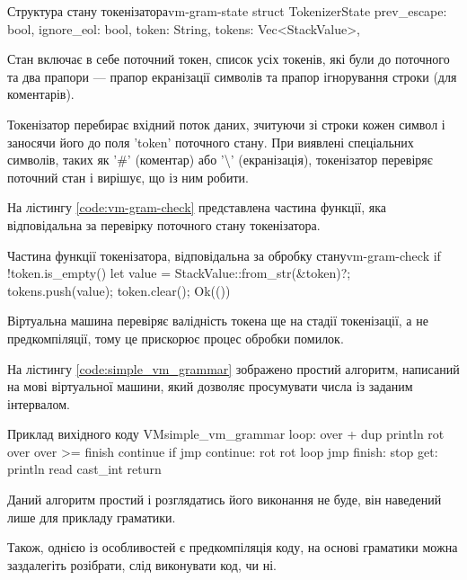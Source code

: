 \documentclass{lib/styles/default-style}
\begin{document}
    \begin{stdout}{Структура стану токенізатора}{vm-gram-state}
        struct TokenizerState {
            prev_escape: bool,
            ignore_eol: bool,
            token: String,
            tokens: Vec<StackValue>,
        }\end{stdout}

    Стан включає в себе поточний токен, список усіх токенів, які були до поточного та два прапори --- прапор екранізації символів 
    та прапор ігнорування строки (для коментарів).

    Токенізатор перебирає вхідний поток даних, зчитуючи зі строки кожен символ і заносячи його до поля 'token' поточного стану.
    При виявлені спеціальних символів, таких як '\#' (коментар) або '\textbackslash' (екранізація), токенізатор перевіряє поточний стан і вирішує,
    що із ним робити.

    На лістингу \ref{code:vm-gram-check} представлена частина функції, яка відповідальна за перевірку поточного стану токенізатора.

    \begin{stdout}{Частина функції токенізатора, відповідальна за обробку стану}{vm-gram-check}
        if !token.is_empty() {
            let value = StackValue::from_str(&token)?;
            tokens.push(value);
            token.clear();
        }
        Ok(())\end{stdout}
    
    Віртуальна машина перевіряє валідність токена ще на стадії токенізації, а не предкомпіляції, тому це прискорює процес обробки
    помилок. 

    На лістингу \ref{code:simple_vm_grammar} зображено простий алгоритм, написаний на мові віртуальної машини,
    який дозволяє просумувати числа із заданим інтервалом.
    
    \begin{stdout}{Приклад вихідного коду VM}{simple_vm_grammar}        
        loop:
        over + dup println
        rot over over
        >= finish continue if jmp
        continue:
        rot rot
        loop jmp
        finish:
        stop
        get:
        println read cast_int return\end{stdout}

    Даний алгоритм простий і розглядатись його виконання не буде, він наведений лише для прикладу граматики.
    
    Також, однією із особливостей є предкомпіляція коду, на основі граматики можна заздалегіть розібрати, слід виконувати код, чи ні.
\end{document}
